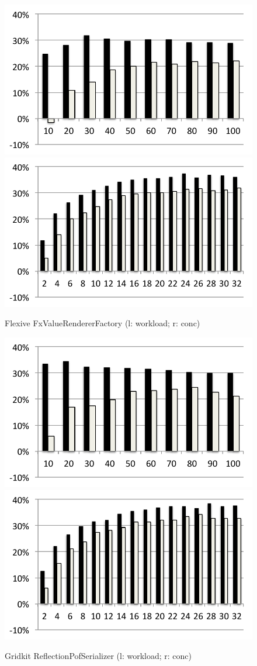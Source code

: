 \begin{figure}
	\begin{minipage}{0.5 \textwidth}
		\includegraphics[width=0.5 \textwidth]{../../eval/32threads/case3it.pdf}\includegraphics[width=0.5 \textwidth]{../../eval/32threads/case3th.pdf}
		\caption{\label{Fi:case3th}Flexive {\sf FxValueRendererFactory} 
			(l: workload; r: conc)}
	\end{minipage}
	\hfill
	\begin{minipage}{0.5 \textwidth}
		\includegraphics[width=0.5 \textwidth]{../../eval/32threads/case4it.pdf}\includegraphics[width=0.5 \textwidth]{../../eval/32threads/case4th.pdf}
		\caption{\label{Fi:case4th}Gridkit {\sf ReflectionPofSerializer}
			(l: workload; r: conc)}
	\end{minipage}
%	

\end{figure}

